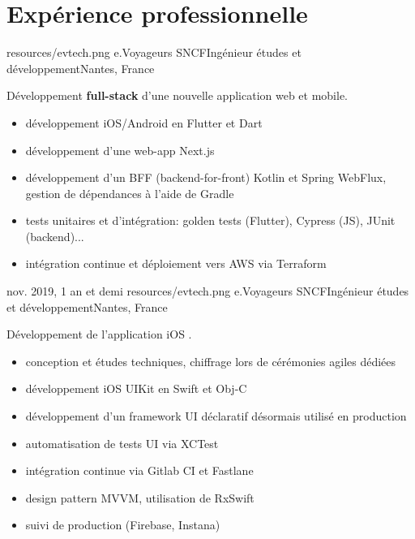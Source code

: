 \documentclass{cv}
\begin{document}
\section{Expérience professionnelle}

{resources/evtech.png}
{e.Voyageurs SNCF}{Ingénieur études et développement}{Nantes, France}{

Développement \textbf{full-stack} d'une nouvelle application web et mobile.

\begin{itemize}
	\item développement iOS/Android en Flutter et Dart
	\item développement d'une web-app Next.js
	\item développement d'un BFF (backend-for-front) Kotlin et Spring WebFlux, gestion de dépendances à l'aide de Gradle
	\item tests unitaires et d'intégration: golden tests (Flutter), Cypress (JS), JUnit (backend)...
	\item intégration continue et déploiement vers AWS via Terraform
\end{itemize}
}

\experience
{{nov. 2019,  1 an et demi}}
{resources/evtech.png}
{e.Voyageurs SNCF}{Ingénieur études et développement}{Nantes, France}{

Développement de l'application iOS \href{https://apps.apple.com/fr/app/oui-sncf-train-et-bus/id343889987}{\link{\ouisncf{}}}.

\begin{itemize}
	\item conception et études techniques, chiffrage lors de cérémonies agiles dédiées
	\item développement iOS UIKit en Swift et Obj-C
	\item développement d'un framework UI déclaratif désormais utilisé en production
	\item automatisation de tests UI via XCTest
	\item intégration continue via Gitlab CI et Fastlane
	\item design pattern MVVM, utilisation de RxSwift
	\item suivi de production (Firebase, Instana)
\end{itemize}
}
\end{document}
